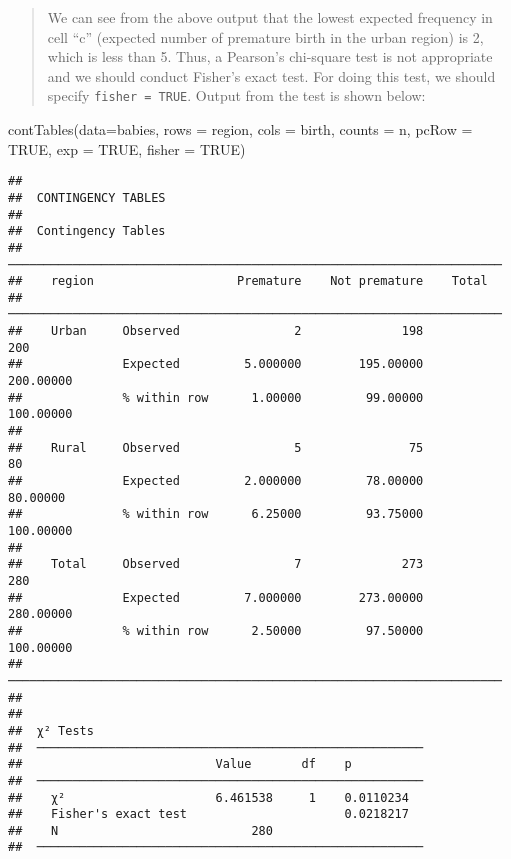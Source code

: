 \documentclass[
]{memoir}
\newenvironment{Shaded}{\begin{snugshade}}{\end{snugshade}}
\newcommand{\AttributeTok}[1]{\textcolor[rgb]{0.77,0.63,0.00}{#1}}
\newcommand{\ConstantTok}[1]{\textcolor[rgb]{0.00,0.00,0.00}{#1}}
\newcommand{\FunctionTok}[1]{\textcolor[rgb]{0.00,0.00,0.00}{#1}}
\newcommand{\NormalTok}[1]{#1}
\begin{document}
\begin{quote}
We can see from the above output that the lowest expected frequency in cell ``c'' (expected number of premature birth in the urban region) is 2, which is less than 5. Thus, a Pearson's chi-square test is not appropriate and we should conduct Fisher's exact test. For doing this test, we should specify \texttt{fisher\ =\ TRUE}. Output from the test is shown below:
\end{quote}

\begin{Shaded}
\begin{Highlighting}[]
\FunctionTok{contTables}\NormalTok{(}\AttributeTok{data=}\NormalTok{babies,}
           \AttributeTok{rows =}\NormalTok{ region, }\AttributeTok{cols =}\NormalTok{ birth, }\AttributeTok{counts =}\NormalTok{ n,}
           \AttributeTok{pcRow =} \ConstantTok{TRUE}\NormalTok{, }\AttributeTok{exp =} \ConstantTok{TRUE}\NormalTok{, }\AttributeTok{fisher =} \ConstantTok{TRUE}\NormalTok{)}
\end{Highlighting}
\end{Shaded}

\begin{verbatim}
## 
##  CONTINGENCY TABLES
## 
##  Contingency Tables                                                    
##  ───────────────────────────────────────────────────────────────────── 
##    region                    Premature    Not premature    Total       
##  ───────────────────────────────────────────────────────────────────── 
##    Urban     Observed                2              198          200   
##              Expected         5.000000        195.00000    200.00000   
##              % within row      1.00000         99.00000    100.00000   
##                                                                        
##    Rural     Observed                5               75           80   
##              Expected         2.000000         78.00000     80.00000   
##              % within row      6.25000         93.75000    100.00000   
##                                                                        
##    Total     Observed                7              273          280   
##              Expected         7.000000        273.00000    280.00000   
##              % within row      2.50000         97.50000    100.00000   
##  ───────────────────────────────────────────────────────────────────── 
## 
## 
##  χ² Tests                                               
##  ────────────────────────────────────────────────────── 
##                           Value       df    p           
##  ────────────────────────────────────────────────────── 
##    χ²                     6.461538     1    0.0110234   
##    Fisher's exact test                      0.0218217   
##    N                           280                      
##  ──────────────────────────────────────────────────────
\end{verbatim}
\end{document}
